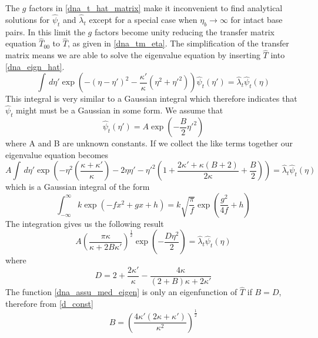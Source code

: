 The $g$ factors in \eqref{dna_t_hat_matrix} make it inconvenient to find analytical solutions for $\hat{\psi}_{t}$ and $\hat{\lambda}_{t}$ except for a special case when $\eta_{b} \to \infty$ for intact base pairs. In this limit the $g$ factors become unity reducing the transfer matrix equation $\hat{T}_{00}$ to $\hat{T}$, as given in \eqref{dna_tm_eta}. The simplification of the transfer matrix means we are able to solve the eigenvalue equation by inserting $\hat{T}$ into \eqref{dna_eign_hat}.
%
\begin{equation}
\int \,d\eta'\exp\left(-\left(\eta-\eta'\right)^2 - \frac{\kappa'}{\kappa}\left(\eta^{2}+\eta'^{2}\right)\right)\hat{\psi}_{t}\left(\eta'\right) = \hat{\lambda}_{t}\hat{\psi}_{t}\left(\eta\right)
\end{equation}
%
This integral is very similar to a Gaussian integral which therefore indicates that $\hat{\psi}_{t}$ might must be a Gaussian in some form. We assume that
%
\begin{equation}
\label{dna_assu_med_eigen}
\hat{\psi}_{t}\left(\eta'\right)=A\exp\left(-\frac{B}{2}\eta'^{2}\right)
\end{equation}
%
where A and B are unknown constants. If we collect the like terms together our eigenvalue equation becomes
%
\begin{equation}
\label{dna_t_int}
A\int \,d\eta'\exp\left(-\eta^{2}\left(\frac{\kappa+\kappa'}{\kappa}\right)-2\eta\eta' -\eta'^{2}\left(1+\frac{2\kappa'+\kappa\left(B+2\right)}{2\kappa}+\frac{B}{2}\right)\right) = \hat{\lambda}_{t}\hat{\psi}_{t}\left(\eta\right)
\end{equation}
%
which is a Gaussian integral of the form
%
\begin{equation}
\label{guass_int}
\int^{\infty}_{-\infty}k\exp\left(-fx^{2}+gx+h\right)=k\sqrt{\frac{\pi}{f}}\exp\left(\frac{g^{2}}{4f}+h\right)
\end{equation}
%
The integration gives us the following result
%
\begin{equation}
A\left(\frac{\pi\kappa}{\kappa+2B\kappa'}\right)^{\frac{1}{2}}\exp\left(-\frac{D\eta^{2}}{2}\right)=\hat{\lambda}_{t}\hat{\psi}_{t}\left(\eta\right)
\end{equation}
%
where
%
\begin{equation}
\label{d_const}
D=2+ \frac{2\kappa'}{\kappa}-\frac{4\kappa}{\left(2+B\right)\kappa +2\kappa'}
\end{equation}
%
The function \eqref{dna_assu_med_eigen} is only an eigenfunction of $\hat{T}$ if $B=D$, therefore from \eqref{d_const}
%
\begin{equation}
B=\left(\frac{4\kappa'\left(2\kappa+\kappa'\right)}{\kappa^{2}}\right)^{\frac{1}{2}}
\end{equation}

